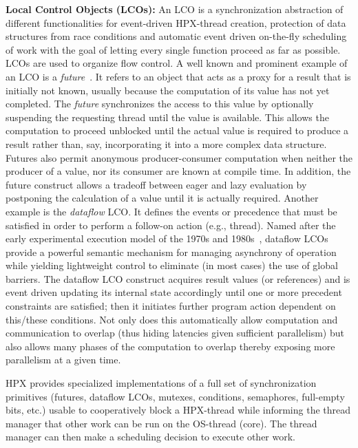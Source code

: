 \documentclass{revtex4}
\newcommand{\I}[1]{\textit{#1}}
\newcommand{\B}[1]{\textbf{#1}}
\begin{document}
\B{Local Control Objects (LCOs):} An LCO is a synchronization abstraction of different
functionalities for event-driven HPX-thread creation, protection of data
structures from race conditions and automatic event driven on-the-fly scheduling
of work with the goal of letting every single function proceed as far as
possible. 
LCOs are used to
organize flow control. A well known and prominent example of an LCO is a
\I{future}~\cite{futures,  Halstead:1985:MLC:4472.4478, Baker:1977:IGC:872736.806932}.
It refers to an object that acts as a proxy for a result that is initially not
known, usually because the computation of its value has not yet completed. The
\I{future} synchronizes the access to this value by optionally suspending
the requesting thread until the value is available. This allows the computation
to proceed unblocked until the actual value is required to produce a result rather
than, say, incorporating it into a more complex data structure.  Futures also
permit anonymous producer-consumer computation when neither the producer
of a value, nor its consumer are known at compile time. In addition, the future
construct allows a tradeoff between eager and lazy evaluation by postponing
the calculation of a value until it is actually required.
Another example is the \I{dataflow} LCO.
It defines the events or precedence that must be satisfied in
order to perform a follow-on action (e.g., thread). Named after the
early experimental execution model of the 1970s and 1980s~\cite{Dennis74,DennisM98,dyn_dataflow},
dataflow LCOs provide a powerful semantic mechanism for managing asynchrony of
operation while yielding lightweight control to eliminate (in most
cases) the use of global barriers. The dataflow LCO construct acquires
result values (or references) and is event driven updating its internal
state accordingly until one or more precedent constraints are satisfied;
then it initiates further program action dependent on this/these
conditions. Not only
does this automatically allow computation and communication to overlap
(thus hiding latencies given sufficient parallelism) but also allows many
phases of the computation to overlap thereby exposing more parallelism
at a given time.

HPX provides specialized
implementations of a full set of synchronization primitives (futures, dataflow LCOs, mutexes,
conditions, semaphores, full-empty bits, etc.) usable to cooperatively block a
HPX-thread while informing the thread manager that other work can be run on the
OS-thread (core). The thread manager can then make a scheduling decision to
execute other work.
\end{document}
